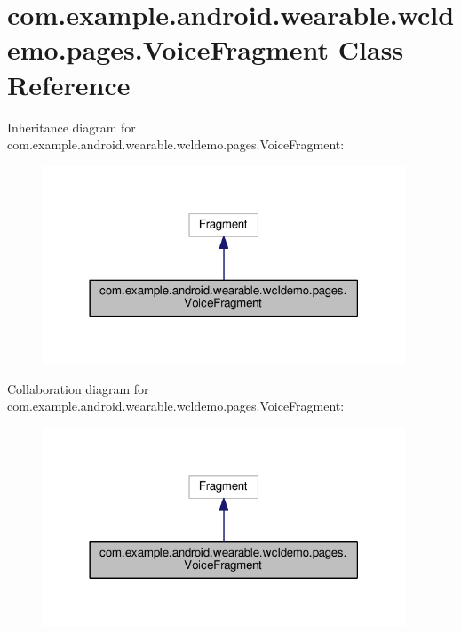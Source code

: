 \hypertarget{classcom_1_1example_1_1android_1_1wearable_1_1wcldemo_1_1pages_1_1VoiceFragment}{}\section{com.\+example.\+android.\+wearable.\+wcldemo.\+pages.\+Voice\+Fragment Class Reference}
\label{classcom_1_1example_1_1android_1_1wearable_1_1wcldemo_1_1pages_1_1VoiceFragment}


Inheritance diagram for com.\+example.\+android.\+wearable.\+wcldemo.\+pages.\+Voice\+Fragment\+:
\nopagebreak
\begin{figure}[H]
\begin{center}
\leavevmode
\includegraphics[width=306pt]{da/d50/classcom_1_1example_1_1android_1_1wearable_1_1wcldemo_1_1pages_1_1VoiceFragment__inherit__graph}
\end{center}
\end{figure}


Collaboration diagram for com.\+example.\+android.\+wearable.\+wcldemo.\+pages.\+Voice\+Fragment\+:
\nopagebreak
\begin{figure}[H]
\begin{center}
\leavevmode
\includegraphics[width=306pt]{d4/d59/classcom_1_1example_1_1android_1_1wearable_1_1wcldemo_1_1pages_1_1VoiceFragment__coll__graph}
\end{center}
\end{figure}
